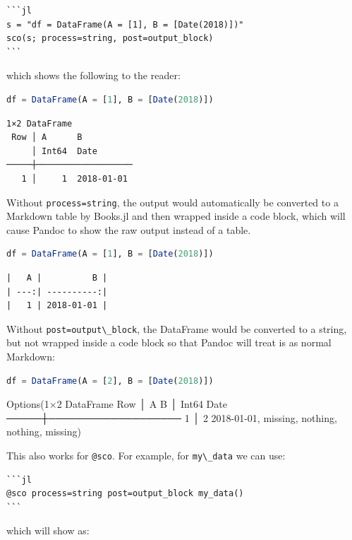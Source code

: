 \documentclass[
  notoc %
]{tufte-book}
\newcommand{\passthrough}[1]{#1}
\begin{document}
\begin{lstlisting}
```jl
s = "df = DataFrame(A = [1], B = [Date(2018)])"
sco(s; process=string, post=output_block)
```
\end{lstlisting}

which shows the following to the reader:

\begin{lstlisting}[language=Julia]
df = DataFrame(A = [1], B = [Date(2018)])
\end{lstlisting}

\begin{lstlisting}[language=Output]
1×2 DataFrame
 Row │ A      B
     │ Int64  Date
─────┼───────────────────
   1 │     1  2018-01-01
\end{lstlisting}

Without \passthrough{\lstinline!process=string!}, the output would
automatically be converted to a Markdown table by Books.jl and then
wrapped inside a code block, which will cause Pandoc to show the raw
output instead of a table.

\begin{lstlisting}[language=Julia]
df = DataFrame(A = [1], B = [Date(2018)])
\end{lstlisting}

\begin{lstlisting}[language=Output]
|   A |          B |
| ---:| ----------:|
|   1 | 2018-01-01 |

\end{lstlisting}

Without \passthrough{\lstinline!post=output\_block!}, the DataFrame
would be converted to a string, but not wrapped inside a code block so
that Pandoc will treat is as normal Markdown:

\begin{lstlisting}[language=Julia]
df = DataFrame(A = [2], B = [Date(2018)])
\end{lstlisting}

Options(1×2 DataFrame Row │ A B │ Int64 Date ─────┼─────────────────── 1
│ 2 2018-01-01, missing, nothing, nothing, missing)

This also works for \passthrough{\lstinline!@sco!}. For example, for
\passthrough{\lstinline!my\_data!} we can use:

\begin{lstlisting}
```jl
@sco process=string post=output_block my_data()
```
\end{lstlisting}

which will show as:
\end{document}
